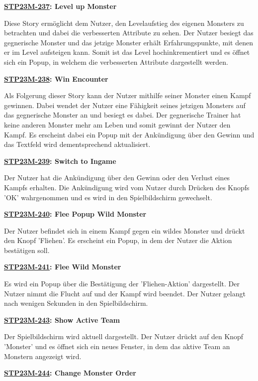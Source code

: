 \textbf{\hyperlink{T237}{\hypertarget{S237}{STP23M-237}}: Level up Monster}

Diese Story ermöglicht dem Nutzer, den Levelaufstieg des eigenen Monsters zu betrachten und dabei die verbesserten Attribute zu sehen. Der Nutzer besiegt das gegnerische Monster und das jetzige Monster erhält Erfahrungspunkte, mit denen er im Level aufsteigen kann. Somit ist das Level hochinkrementiert und es öffnet sich ein Popup, in welchem die verbesserten Attribute dargestellt werden.

\textbf{\hyperlink{T238}{\hypertarget{S238}{STP23M-238}}: Win Encounter}

Als Folgerung dieser Story kann der Nutzer mithilfe seiner Monster einen Kampf gewinnen. Dabei wendet der Nutzer eine Fähigkeit seines jetzigen Monsters auf das gegnerische Monster an und besiegt es dabei. Der gegnerische Trainer hat keine anderen Monster mehr am Leben und somit gewinnt der Nutzer den Kampf. Es erscheint dabei ein Popup mit der Ankündigung über den Gewinn und das Textfeld wird dementsprechend aktualisiert. 

\textbf{\hyperlink{T239}{\hypertarget{S239}{STP23M-239}}: Switch to Ingame}

Der Nutzer hat die Ankündigung über den Gewinn oder den Verlust eines Kampfs erhalten. Die Ankündigung wird vom Nutzer durch Drücken des Knopfs 'OK' wahrgenommen und es wird in den Spielbildschirm gewechselt. 

\textbf{\hyperlink{T240}{\hypertarget{S240}{STP23M-240}}: Flee Popup Wild Monster}

Der Nutzer befindet sich in einem Kampf gegen ein wildes Monster und drückt den Knopf 'Fliehen'. Es erscheint ein Popup, in dem der Nutzer die Aktion bestätigen soll.

\textbf{\hyperlink{T241}{\hypertarget{S241}{STP23M-241}}: Flee Wild Monster}

Es wird ein Popup über die Bestätigung der 'Fliehen-Aktion' dargestellt. Der Nutzer nimmt die Flucht auf und der Kampf wird beendet. Der Nutzer gelangt nach wenigen Sekunden in den Spielbildschirm.

\textbf{\hyperlink{T243}{\hypertarget{S243}{STP23M-243}}: Show Active Team}

Der Spielbildschirm wird aktuell dargestellt. Der Nutzer drückt auf den Knopf 'Monster' und es öffnet sich ein neues Fenster, in dem das aktive Team an Monstern angezeigt wird.

\textbf{\hyperlink{T244}{\hypertarget{S244}{STP23M-244}}: Change Monster Order}

